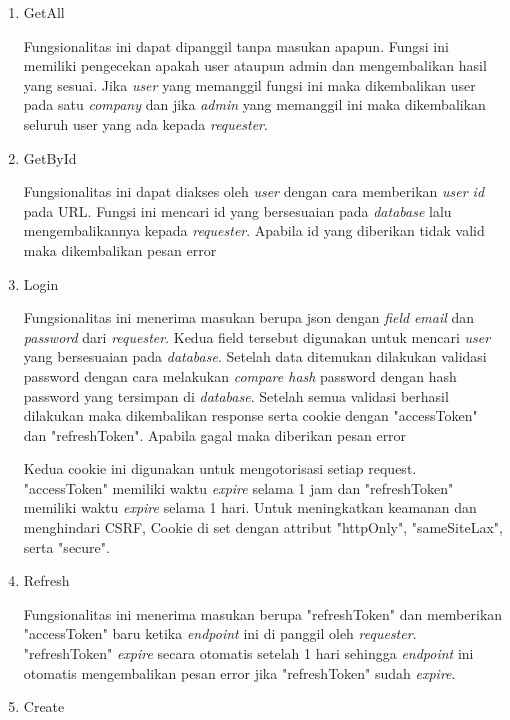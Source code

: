 \begin{enumerate}
  \item GetAll

        Fungsionalitas ini dapat dipanggil tanpa masukan apapun. Fungsi ini memiliki pengecekan apakah user ataupun admin dan mengembalikan hasil yang sesuai. Jika \textit{user} yang memanggil fungsi ini maka dikembalikan user pada satu \textit{company} dan jika \textit{admin} yang memanggil ini maka dikembalikan seluruh user yang ada kepada \textit{requester}.

  \item GetById

        Fungsionalitas ini dapat diakses oleh \textit{user} dengan cara memberikan \textit{user id} pada URL. Fungsi ini mencari id yang bersesuaian pada \textit{database} lalu mengembalikannya kepada \textit{requester}. Apabila id yang diberikan tidak valid maka dikembalikan pesan error

  \item Login

        Fungsionalitas ini menerima masukan berupa json dengan \textit{field} \textit{email} dan \textit{password} dari \textit{requester}. Kedua field tersebut digunakan untuk mencari \textit{user} yang bersesuaian pada \textit{database}. Setelah data ditemukan dilakukan validasi password dengan cara melakukan \textit{compare hash} password dengan hash password yang tersimpan di \textit{database}. Setelah semua validasi berhasil dilakukan maka dikembalikan response serta cookie dengan "accessToken" dan "refreshToken". Apabila gagal maka diberikan pesan error

        Kedua cookie ini digunakan untuk mengotorisasi setiap request. "accessToken" memiliki waktu \textit{expire} selama 1 jam dan "refreshToken" memiliki waktu \textit{expire} selama 1 hari. Untuk meningkatkan keamanan dan menghindari CSRF, Cookie di set dengan attribut "httpOnly", "sameSiteLax", serta "secure".

  \item Refresh

        Fungsionalitas ini menerima masukan berupa "refreshToken" dan memberikan "accessToken" baru ketika \textit{endpoint} ini di panggil oleh \textit{requester}. "refreshToken" \textit{expire} secara otomatis setelah 1 hari sehingga \textit{endpoint} ini otomatis mengembalikan pesan error jika "refreshToken" sudah \textit{expire}.

  \item Create


\end{enumerate}
